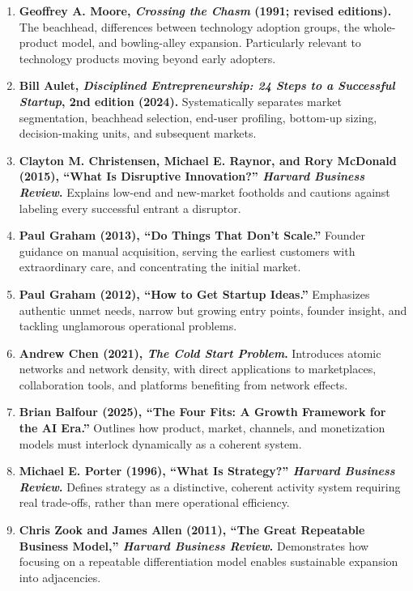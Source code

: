 \begin{enumerate}
    \item[\textbf{[R1]}] \textbf{Geoffrey A. Moore, \emph{Crossing the Chasm} (1991; revised editions).} The beachhead, differences between technology adoption groups, the whole-product model, and bowling-alley expansion. Particularly relevant to technology products moving beyond early adopters.
    \item[\textbf{[R2]}] \textbf{Bill Aulet, \emph{Disciplined Entrepreneurship: 24 Steps to a Successful Startup}, 2nd edition (2024).} Systematically separates market segmentation, beachhead selection, end-user profiling, bottom-up sizing, decision-making units, and subsequent markets.
    \item[\textbf{[R3]}] \textbf{Clayton M. Christensen, Michael E. Raynor, and Rory McDonald (2015), ``What Is Disruptive Innovation?'' \emph{Harvard Business Review}.} Explains low-end and new-market footholds and cautions against labeling every successful entrant a disruptor.
    \item[\textbf{[R4]}] \textbf{Paul Graham (2013), ``Do Things That Don't Scale.''} Founder guidance on manual acquisition, serving the earliest customers with extraordinary care, and concentrating the initial market.
    \item[\textbf{[R5]}] \textbf{Paul Graham (2012), ``How to Get Startup Ideas.''} Emphasizes authentic unmet needs, narrow but growing entry points, founder insight, and tackling unglamorous operational problems.
    \item[\textbf{[R6]}] \textbf{Andrew Chen (2021), \emph{The Cold Start Problem}.} Introduces atomic networks and network density, with direct applications to marketplaces, collaboration tools, and platforms benefiting from network effects.
    \item[\textbf{[R7]}] \textbf{Brian Balfour (2025), ``The Four Fits: A Growth Framework for the AI Era.''} Outlines how product, market, channels, and monetization models must interlock dynamically as a coherent system.
    \item[\textbf{[R8]}] \textbf{Michael E. Porter (1996), ``What Is Strategy?'' \emph{Harvard Business Review}.} Defines strategy as a distinctive, coherent activity system requiring real trade-offs, rather than mere operational efficiency.
    \item[\textbf{[R9]}] \textbf{Chris Zook and James Allen (2011), ``The Great Repeatable Business Model,'' \emph{Harvard Business Review}.} Demonstrates how focusing on a repeatable differentiation model enables sustainable expansion into adjacencies.

\end{enumerate}
